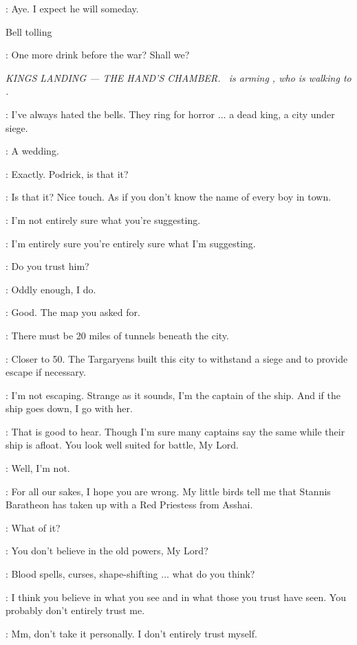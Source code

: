 \BRONN: Aye. I expect he will someday. 

\sfx Bell tolling

\BRONN: One more drink before the war? Shall we? 


\scene

\textit{KINGS LANDING --- THE HAND'S CHAMBER. \PODRICK ~is
arming \TYRION, who is walking to \VARYS.} 

\VARYS: I've always hated the bells. They ring for horror $\ldots$ a dead king, a city under siege. 

\TYRION: A wedding. 

\VARYS: Exactly. Podrick, is that it? 

\TYRION: Is that it? Nice touch. As if you don't know the name of every boy in town. 

\VARYS: I'm not entirely sure what you're suggesting. 

\TYRION: I'm entirely sure you're entirely sure what I'm suggesting. 

\VARYS: Do you trust him? 

\TYRION: Oddly enough, I do. 

\VARYS: Good. The map you asked for. 

\TYRION: There must be 20 miles of tunnels beneath the city. 

\VARYS: Closer to 50. The Targaryens built this city to withstand a siege and to provide escape if necessary. 

\TYRION: I'm not escaping. Strange as it sounds, I'm the captain of the ship. And if the ship goes down, I go with her. 

\VARYS: That is good to hear. Though I'm sure many captains say the same while their ship is afloat. You look well suited for battle, My Lord. 

\TYRION: Well, I'm not. 

\VARYS: For all our sakes, I hope you are wrong. My little birds tell me that Stannis Baratheon has taken up with a Red Priestess from Asshai. 

\TYRION: What of it? 

\VARYS: You don't believe in the old powers, My Lord? 

\TYRION: Blood spells, curses, shape-shifting $\ldots$ what do you think? 

\VARYS: I think you believe in what you see and in what those you trust have seen. You probably don't entirely trust me. 

\TYRION: Mm, don't take it personally. I don't entirely trust myself. 

